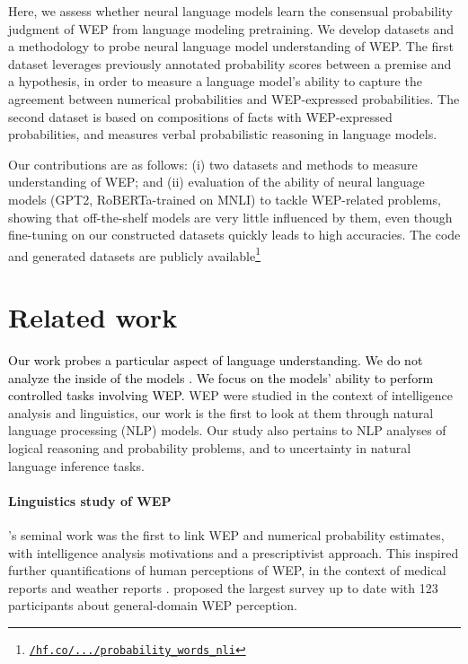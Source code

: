 \documentclass[11pt]{article}
\def \thecolor {black}
\newcommand{\blue}[1]{\textcolor{\thecolor}{#1}}
\begin{document}
Here, we assess whether neural language models learn the consensual probability judgment of WEP from language modeling pretraining. We develop datasets and a methodology to probe neural language model understanding of WEP. The first dataset leverages previously annotated probability scores between a premise and a hypothesis, in order to measure a language model's ability to capture the agreement between numerical probabilities and WEP-expressed probabilities. The second dataset is based on compositions of facts with WEP-expressed probabilities, and measures verbal probabilistic reasoning in language models.

Our contributions are as follows: (i) two datasets and methods to measure understanding of WEP; and  (ii) evaluation of the ability of neural language models (GPT2, RoBERTa-trained on MNLI) to tackle WEP-related problems, showing that off-the-shelf models are very little influenced by them, even though fine-tuning on our constructed datasets quickly leads to high accuracies. The code and generated datasets are publicly available\footnote{\href{https://huggingface.co/datasets/sileod/probability_words_nli}{\texttt{/hf.co/.../probability\_words\_nli}}}



\section{Related work}
\blue{Our work probes a particular aspect of language understanding. We do not analyze the inside of the models \citep{rogers-etal-2020-bertology}. We focus on the models' ability to perform controlled tasks \citep{naik-etal-2018-stress,richardson2020probing} involving WEP.} WEP were studied in the context of intelligence analysis and linguistics, our work is the first to look at them through natural language processing (NLP) models. Our study also pertains to NLP analyses of logical reasoning and probability problems, and to uncertainty in natural language inference tasks. 
\vspace{-0.1cm}
\paragraph{Linguistics study of WEP} \citet{kent1964words}'s seminal work was the first to link WEP and numerical probability estimates, with intelligence analysis motivations \citep{dhami2021words} and a prescriptivist approach. This inspired further quantifications of human perceptions of WEP, in the context of medical reports \citep{OBrien1989WordsON, ott2021words} and weather reports \citep{lenhardt2020likely}. \citet{fagen-ulmschneider} proposed  the largest survey up to date with 123 participants about general-domain WEP perception. 
\vspace{-0.1cm}
\end{document}
